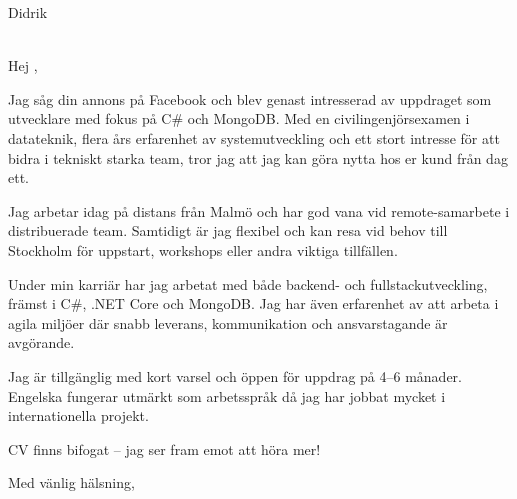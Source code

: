 \documentclass[a4paper,10pt]{letter}
\date{\today}
\begin{document}
\begin{letter}{Didrik  \\ \\ }

\opening{Hej ,}

Jag såg din annons på Facebook och blev genast intresserad av uppdraget som utvecklare med fokus på C\# och MongoDB. Med en civilingenjörsexamen i datateknik, flera års erfarenhet av systemutveckling och ett stort intresse för att bidra i tekniskt starka team, tror jag att jag kan göra nytta hos er kund från dag ett.

Jag arbetar idag på distans från Malmö och har god vana vid remote-samarbete i distribuerade team. Samtidigt är jag flexibel och kan resa vid behov till Stockholm för uppstart, workshops eller andra viktiga tillfällen.

Under min karriär har jag arbetat med både backend- och fullstackutveckling, främst i C\#, .NET Core och MongoDB. Jag har även erfarenhet av att arbeta i agila miljöer där snabb leverans, kommunikation och ansvarstagande är avgörande.
    
Jag är tillgänglig med kort varsel och öppen för uppdrag på 4–6 månader. Engelska fungerar utmärkt som arbetsspråk då jag har jobbat mycket i internationella projekt.

CV finns bifogat – jag ser fram emot att höra mer!

\closing{Med vänlig hälsning,}

\end{letter}
\end{document}
